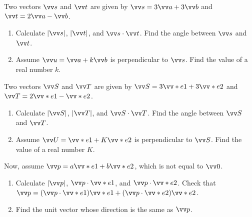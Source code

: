 \documentclass[11pt,pdfa,lastpage]{MishoNote}
\begin{document}
\begin{problems}
 Two vectors $\vc s$ and $\vc t$ are given by $\vc s=3\vc a+3\vc b$ and $\vc t=2\vc a-\vc b$.
  \begin{enumerate}
    \item Calculate $|\vc s|$, $|\vc t|$, and $\vc s\cdot\vc t$. Find the angle between $\vc s$ and $\vc t$.
    \item Assume $\vc u=\vc a+k\vc b$ is perpendicular to $\vc s$. Find the value of a real number $k$.
  \end{enumerate}
  Two vectors $\vc S$ and $\vc T$ are given by $\vc S=3\vc e_1+3\vc e_2$ and $\vc T=2\vc e_1-\vc e_2$.
  \begin{enumerate}[resume]
    \item Calculate $|\vc S|$, $|\vc T|$, and $\vc S\cdot\vc T$. Find the angle between $\vc S$ and $\vc T$.
    \item Assume $\vc U=\vc e_1+K\vc e_2$ is perpendicular to $\vc S$. Find the value of a real number $K$.
  \end{enumerate}
  Now, assume $\vc p=a\vc e_1+b\vc e_2$, which is not equal to $\vc 0$.
  \begin{enumerate}[resume]
    \item Calculate $|\vc p|$, $\vc p\cdot\vc e_1$, and $\vc p\cdot\vc e_2$. Check that $\vc p=(\vc p\cdot\vc e_1)\vc e_1+(\vc p\cdot\vc e_2)\vc e_2$.
    \item Find the unit vector whose direction is the same as $\vc p$.
  \end{enumerate}
\end{problems}
\end{document}
